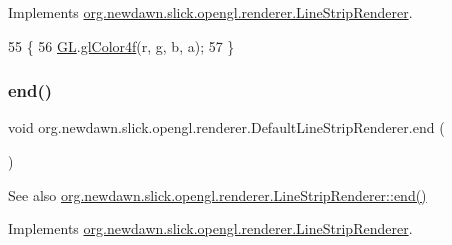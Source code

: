 Implements \mbox{\hyperlink{interfaceorg_1_1newdawn_1_1slick_1_1opengl_1_1renderer_1_1_line_strip_renderer_ac54eda776408b41d1e5ccaa988267162}{org.\+newdawn.\+slick.\+opengl.\+renderer.\+Line\+Strip\+Renderer}}.


\begin{DoxyCode}
55                                                           \{
56         \mbox{\hyperlink{classorg_1_1newdawn_1_1slick_1_1opengl_1_1renderer_1_1_default_line_strip_renderer_a8c4f5b0df77bf3a446d9d570f26e4171}{GL}}.\mbox{\hyperlink{interfaceorg_1_1newdawn_1_1slick_1_1opengl_1_1renderer_1_1_s_g_l_a0dab1e4788ac76db632800701d9b959d}{glColor4f}}(r, g, b, a);
57     \}
\end{DoxyCode}
\mbox{\label{classorg_1_1newdawn_1_1slick_1_1opengl_1_1renderer_1_1_default_line_strip_renderer_a544d66d8f579f2f5fd3cf62fdf0c4038}} 
\subsubsection{\texorpdfstring{end()}{end()}}
{\footnotesize\ttfamily void org.\+newdawn.\+slick.\+opengl.\+renderer.\+Default\+Line\+Strip\+Renderer.\+end (\begin{DoxyParamCaption}{ }\end{DoxyParamCaption})\hspace{0.3cm}{\ttfamily [inline]}}

\begin{DoxySeeAlso}{See also}
\mbox{\hyperlink{interfaceorg_1_1newdawn_1_1slick_1_1opengl_1_1renderer_1_1_line_strip_renderer_a59c0befa698a8a069ce66fa134c1f284}{org.\+newdawn.\+slick.\+opengl.\+renderer.\+Line\+Strip\+Renderer\+::end()}} 
\end{DoxySeeAlso}


Implements \mbox{\hyperlink{interfaceorg_1_1newdawn_1_1slick_1_1opengl_1_1renderer_1_1_line_strip_renderer_a59c0befa698a8a069ce66fa134c1f284}{org.\+newdawn.\+slick.\+opengl.\+renderer.\+Line\+Strip\+Renderer}}.


